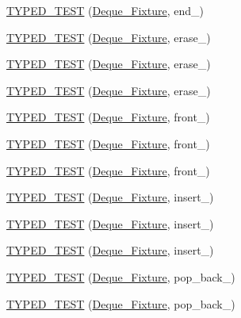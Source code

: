 \begin{DoxyCompactItemize}
\hyperlink{TestDeque_8c_09_09_aa142d850e021933274a7177606a5b808}{T\-Y\-P\-E\-D\-\_\-\-T\-E\-S\-T} (\hyperlink{structDeque__Fixture}{Deque\-\_\-\-Fixture}, end\-\_)
\item 
\hyperlink{TestDeque_8c_09_09_a6bffc668503b35b4bbe4ba43b5287cc2}{T\-Y\-P\-E\-D\-\_\-\-T\-E\-S\-T} (\hyperlink{structDeque__Fixture}{Deque\-\_\-\-Fixture}, erase\-\_)
\item 
\hyperlink{TestDeque_8c_09_09_a4466fa11f2df094cc1592ce94cb845fa}{T\-Y\-P\-E\-D\-\_\-\-T\-E\-S\-T} (\hyperlink{structDeque__Fixture}{Deque\-\_\-\-Fixture}, erase\-\_)
\item 
\hyperlink{TestDeque_8c_09_09_a24c0b004a4f52256c8f511dd98525dbe}{T\-Y\-P\-E\-D\-\_\-\-T\-E\-S\-T} (\hyperlink{structDeque__Fixture}{Deque\-\_\-\-Fixture}, erase\-\_)
\item 
\hyperlink{TestDeque_8c_09_09_a973c77b7123b8aacb574ed5e6c50d52b}{T\-Y\-P\-E\-D\-\_\-\-T\-E\-S\-T} (\hyperlink{structDeque__Fixture}{Deque\-\_\-\-Fixture}, front\-\_)
\item 
\hyperlink{TestDeque_8c_09_09_a06960713622081d1127d383f0efaabbd}{T\-Y\-P\-E\-D\-\_\-\-T\-E\-S\-T} (\hyperlink{structDeque__Fixture}{Deque\-\_\-\-Fixture}, front\-\_)
\item 
\hyperlink{TestDeque_8c_09_09_a03784defeb5e99116ab6ce895edbdf31}{T\-Y\-P\-E\-D\-\_\-\-T\-E\-S\-T} (\hyperlink{structDeque__Fixture}{Deque\-\_\-\-Fixture}, front\-\_)
\item 
\hyperlink{TestDeque_8c_09_09_ac59f89d7a06d906596743d235b3531d5}{T\-Y\-P\-E\-D\-\_\-\-T\-E\-S\-T} (\hyperlink{structDeque__Fixture}{Deque\-\_\-\-Fixture}, insert\-\_)
\item 
\hyperlink{TestDeque_8c_09_09_a199d00b66245a7d82f664bec8b8d7bed}{T\-Y\-P\-E\-D\-\_\-\-T\-E\-S\-T} (\hyperlink{structDeque__Fixture}{Deque\-\_\-\-Fixture}, insert\-\_)
\item 
\hyperlink{TestDeque_8c_09_09_aeb4838728ce9b37ab7e523461c40dc75}{T\-Y\-P\-E\-D\-\_\-\-T\-E\-S\-T} (\hyperlink{structDeque__Fixture}{Deque\-\_\-\-Fixture}, insert\-\_)
\item 
\hyperlink{TestDeque_8c_09_09_a88c1bbad945d34322a1094ed2b3b182d}{T\-Y\-P\-E\-D\-\_\-\-T\-E\-S\-T} (\hyperlink{structDeque__Fixture}{Deque\-\_\-\-Fixture}, pop\-\_\-back\-\_)
\item 
\hyperlink{TestDeque_8c_09_09_a9921688472223c5c7b60f134f7838eee}{T\-Y\-P\-E\-D\-\_\-\-T\-E\-S\-T} (\hyperlink{structDeque__Fixture}{Deque\-\_\-\-Fixture}, pop\-\_\-back\-\_)
\item 

\end{DoxyCompactItemize}
